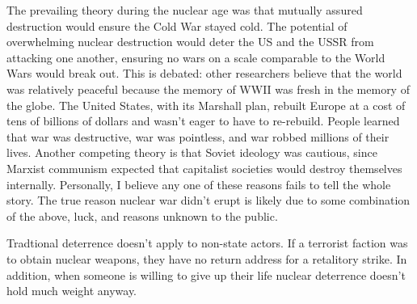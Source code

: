 \documentclass[nobib]{tufte-handout}
\begin{document}
The prevailing theory during the nuclear age 
was that mutually assured destruction would 
ensure the Cold War stayed cold. The potential 
of overwhelming nuclear destruction would deter 
the US and the USSR from attacking one another, 
ensuring no wars on a scale comparable to the 
World Wars would break out. This is debated:
other researchers believe that the world was 
relatively peaceful because the memory of WWII
was fresh in the memory of the globe. The United 
States, with its Marshall plan, rebuilt Europe 
at a cost of tens of billions of dollars and wasn't 
eager to have to re-rebuild. People learned 
that war was destructive, war was pointless, 
and war robbed millions of their lives. Another 
competing theory is that Soviet ideology was 
cautious, since Marxist communism expected 
that capitalist societies would destroy themselves 
internally. Personally, I believe any 
one of these reasons fails to tell the whole story. 
The true reason nuclear war didn't erupt is 
likely due to some combination of the above, luck, 
and reasons unknown to the public. 

Tradtional deterrence doesn't apply to non-state 
actors. If a terrorist faction was to obtain 
nuclear weapons, they have no return address 
for a retalitory strike. In addition, when 
someone is willing to give up their life 
nuclear deterrence doesn't hold much weight 
anyway. 
\end{document}
